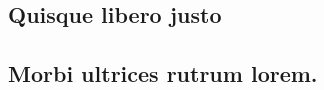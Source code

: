 \documentclass[
	12pt,				%
	openright,			%
	twoside,			%
	a4paper,			%
	english,			%
	french,				%
	spanish,			%
	brazil				%
	]{abntex2}
\begin{document}
\postextual



%
%


\begin{apendicesenv}

\partapendices

\chapter{Quisque libero justo}

\lipsum[50]

\end{apendicesenv}



\begin{anexosenv}

\partanexos

\chapter{Morbi ultrices rutrum lorem.}
\lipsum[30]

\end{anexosenv}

\printindex
\end{document}
